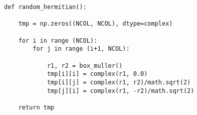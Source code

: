 \begin{lstlisting}
def random_hermitian():

    tmp = np.zeros((NCOL, NCOL), dtype=complex)

    for i in range (NCOL):
        for j in range (i+1, NCOL):

            r1, r2 = box_muller()
            tmp[i][i] = complex(r1, 0.0)
            tmp[i][j] = complex(r1, r2)/math.sqrt(2)
            tmp[j][i] = complex(r1, -r2)/math.sqrt(2)

    return tmp 
\end{lstlisting}